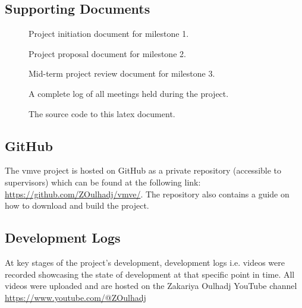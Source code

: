 \documentclass[11pt]{article}
\begin{document}
\subsection{Supporting Documents} \label{supporting_documents}
\begin{description}
  \item[] 
    Project initiation document for milestone 1.
  \item[]
    Project proposal document for milestone 2.
  \item[]
    Mid-term project review document for milestone 3.
  \item[]
    A complete log of all meetings held during the project.
  \item[]
    The source code to this latex document.
\end{description}

\subsection{GitHub} \label{github}
The \gls*{vmve} project is hosted on GitHub as a private repository (accessible
to supervisors) which can be found at the following link:
\url{https://github.com/ZOulhadj/vmve/}. The repository also contains a guide on
how to download and build the project.

\subsection{Development Logs}
At key stages of the project's development, development logs i.e. videos were
recorded showcasing the state of development at that specific point in time. All
videos were uploaded and are hosted on the Zakariya Oulhadj YouTube channel
\url{https://www.youtube.com/@ZOulhadj}
\end{document}

